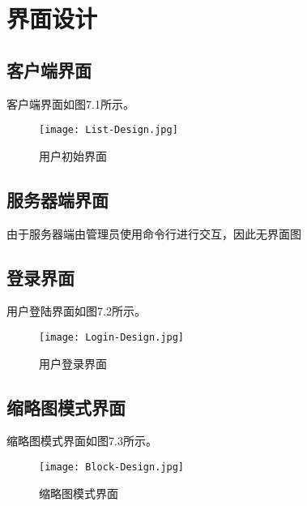 \chapter{界面设计}
    \section{客户端界面}
客户端界面如图7.1所示。
        \begin{figure}[!h]
            \centering
            \texttt{[image: List-Design.jpg]}
            \caption{用户初始界面}\label{fig:noted-figure}
        \end{figure}

    \section{服务器端界面}
        由于服务器端由管理员使用命令行进行交互，因此无界面图

    \section{登录界面}
用户登陆界面如图7.2所示。
        \begin{figure}[!h]
            \centering
            \texttt{[image: Login-Design.jpg]}
            \caption{用户登录界面}\label{fig:noted-figure}
        \end{figure}

    \section{缩略图模式界面}
缩略图模式界面如图7.3所示。
        \begin{figure}[!h] 
            \centering
            \texttt{[image: Block-Design.jpg]}
            \caption{缩略图模式界面}\label{fig:noted-figure}
        \end{figure}
